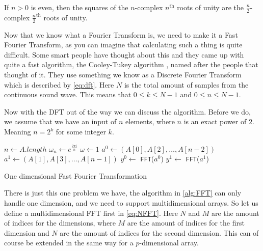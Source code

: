 \begin{lemma} \label{lemma:halving}
    If $n > 0$ is even, then the squares of the $n$-complex $n^{\text{th}}$ roots of unity are the $\frac{n}{2}$-complex $\frac{n}{2}^{\text{th}}$ roots of unity.
\end{lemma}

Now that we know what a Fourier Transform is, we need to make it a Fast Fourier Transform, as you can imagine that calculating such a thing is quite difficult. Some smart people have thought
about this and they came up with quite a fast algorithm, the Cooley-Tukey algorithm \cite{fft}, named after the people that thought of it. They use something we know as a Discrete Fourier 
Transform which is described by \autoref{eq:dft}. Here $N$ is the total amount of samples from the continuous sound wave. This means that $0 \leq k \leq N - 1$ and $0 \leq n \leq N - 1$.

Now with the DFT out of the way we can discuss the algorithm. Before we do, we assume that we have an input of $n$ elements, where $n$ is an exact power of $2$. Meaning $n = 2^k$ for some 
integer $k$.

\begin{algorithm}
    $n \leftarrow A.length$ \;
    $\omega_n \leftarrow e^{\frac{2\pi i}{n}}$ \;
    $\omega \leftarrow 1$ \;
    $a^0 \leftarrow (A[0], A[2], \dots, A[n - 2])$ \;
    $a^1 \leftarrow (A[1], A[3], \dots, A[n - 1])$ \;
    $y^0 \leftarrow $ \texttt{FFT}($a^0$) \;
    $y^1 \leftarrow $ \texttt{FFT}($a^1$) \;
    \caption{One dimensional Fast Fourier Transformation}
    \label{alg:FFT}
\end{algorithm}

There is just this one problem we have, the algorithm in \autoref{alg:FFT} can only handle one dimension, and we need to support multidimensional arrays. So let us define a multidimensional FFT 
first in \autoref{eq:NFFT}. Here $N$ and $M$ are the amount of indices for the dimensions, where $M$ are the amount of indices for the first dimension and $N$ are the amount of indices for the 
second dimension. This can of course be extended in the same way for a $p$-dimensional array.

